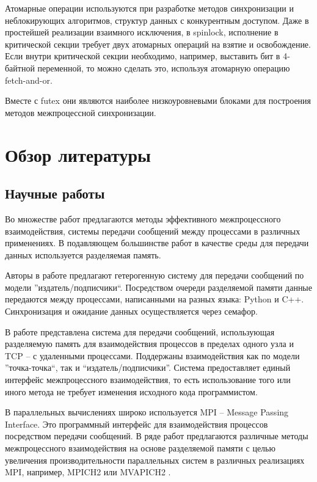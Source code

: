 Атомарные операции используются при разработке методов синхронизации и неблокирующих алгоритмов, структур данных с конкурентным доступом. Даже в простейшей реализации взаимного исключения, в spinlock, исполнение в критической секции требует двух атомарных операций на взятие и освобождение. Если внутри критической секции необходимо, например, выставить бит в 4-байтной переменной, то можно сделать это, используя атомарную операцию fetch-and-or. 

Вместе с futex они являются наиболее низкоуровневыми блоками для построения методов межпроцессной синхронизации.

\section{Обзор литературы}

\subsection{Научные работы}
Во множестве работ предлагаются методы эффективного межпроцессного взаимодействия, системы передачи сообщений между процессами в различных применениях. В подавляющем большинстве работ в качестве среды для передачи данных используется разделяемая память.

Авторы в работе \cite{7790679} предлагают гетерогенную систему для передачи сообщений по модели ''издатель/подписчики``. Посредством очереди разделяемой памяти данные передаются между процессами, написанными на разных языка: Python и C++. Синхронизация и ожидание данных осуществляется через семафор.

В работе \cite{ShMemTransportThesis} представлена система для передачи сообщений, использующая разделяемую память для взаимодействия процессов в пределах одного узла и TCP -- с удаленными процессами. Поддержаны взаимодействия как по модели ''точка-точка``, так и ``издатель/подписчики''. Система предоставляет единый интерфейс межпроцессного взаимодействия, то есть использование того или иного метода не требует изменения исходного кода программистом.

В параллельных вычислениях широко используется MPI -- Message Passing Interface. Это программный интерфейс для взаимодействия процессов посредством передачи сообщений. В ряде работ предлагаются различные методы межпроцессного взаимодействия на основе разделяемой памяти с целью увеличения производительности параллельных систем в различных реализациях MPI, например, MPICH2 \cite{10.1007/11846802_19, 8665755} или MVAPICH2 \cite{4100356, 4663761}.

